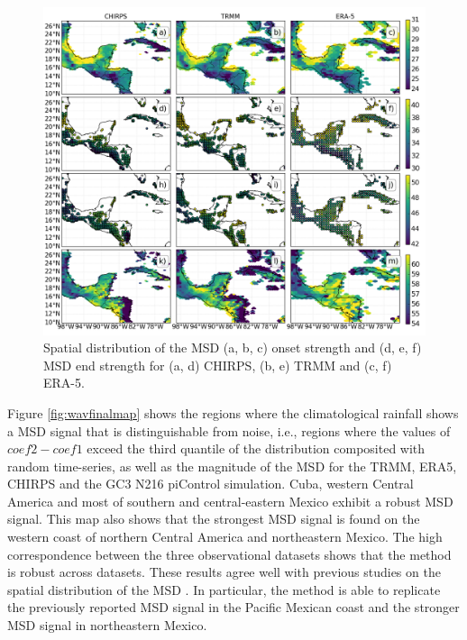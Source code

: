 \begin{figure}[t!]
\centering
 \includegraphics[width=\linewidth]{figures/wav_fig13.png}
\caption[Spatial distribution of MSD timings]{  Spatial distribution of the MSD (a, b, c) onset strength and (d, e, f) MSD end strength for (a, d) CHIRPS, (b, e) TRMM and (c, f) ERA-5. }
\label{fig:wav_fig13}
\end{figure}


Figure \ref{fig:wavfinalmap} shows the regions where the climatological rainfall shows a MSD signal that is distinguishable from noise, i.e., regions where the values of $coef2-coef1$ exceed the third quantile of the distribution composited with random time-series, as well as the magnitude of the MSD for the TRMM, ERA5, CHIRPS and the GC3 N216 piControl simulation. Cuba, western Central America and most of southern and central-eastern Mexico exhibit a robust MSD signal. 
This map also shows that the strongest MSD signal is found on the western coast of northern Central America and northeastern Mexico. 
The high correspondence between the three observational datasets shows that the method is robust across datasets. These results agree well with previous studies on the spatial distribution of the MSD \citep{magana1999,perdigon2018,anderson2019multiscale,zhao2021}. In particular, the method is able to replicate the previously reported MSD signal in the Pacific Mexican coast and the stronger MSD signal in northeastern Mexico.  



